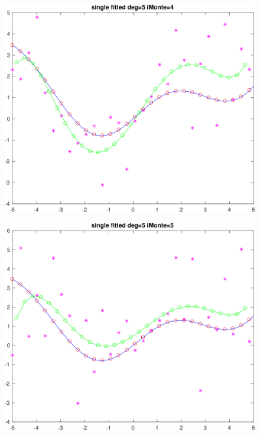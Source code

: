 \begin{figure}[h!]
\centering\includegraphics[scale=0.1]{single_poly_d_5_iMonte_4.png}
\end{figure}


\begin{figure}[h!]
\centering\includegraphics[scale=0.1]{single_poly_d_5_iMonte_5.png}
\end{figure}


